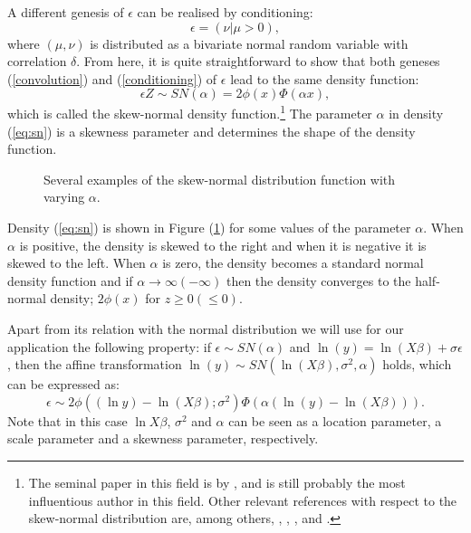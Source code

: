 \documentclass[11pt,parskip,abstracton,notitlepage]{scrartcl}
\begin{document}
A different genesis of $\epsilon $ can be realised by conditioning:
%
\begin{equation}
\epsilon  = (\nu|\mu>0),
\label{conditioning}
\end{equation}
%
where $(\mu, \nu)$ is distributed as a bivariate normal random variable with correlation $\delta$. From here, it is quite straightforward to show that both geneses (\ref{convolution}) and (\ref{conditioning}) of $\epsilon $ lead to the same density function:
%
\begin{equation}
\epsilon Z\sim SN(\alpha) = 2\phi(x)\Phi(\alpha x),
\label{eq:sn}
\end{equation}
%
which is called the skew-normal density function.\footnote{The seminal paper in this field is by \cite{AZZALINI1985}, and is still probably the most influentious author in this field. Other relevant references with respect to the skew-normal distribution are, among others, \citet{AZZALINI1996}, \citet{AZZALINI1999}, \citet{AZZALINI2005}, \citet{arellano2006unification} and \citet{arellano2008centred}.} The parameter $\alpha$ in density (\ref{eq:sn}) is a skewness parameter and determines the shape of the density function. 
%
\begin{figure}[h]
	\center
{}
\caption{Several examples of the skew-normal distribution function with varying $\alpha$.}
\label{fig:sn}
\end{figure}
%

Density (\ref{eq:sn}) is shown in Figure (\ref{fig:sn}) for some values of the parameter $\alpha$. When $\alpha$ is positive, the density is skewed to the right and when it is negative it is skewed to the left. When $\alpha$ is zero, the density becomes a standard normal density function and if $\alpha \rightarrow \infty (-\infty)$ then the density converges to the half-normal density; $2\phi(x)$ for $z \geq 0 (\leq 0)$.

Apart from its relation with the normal distribution we will use for our application the following property: if $\epsilon  \sim SN(\alpha)$ and $\ln (y) = \ln \left(X\beta\right) + \sigma \epsilon $, then the affine transformation $\ln (y) \sim SN (\ln \left(X\beta\right) , \sigma^2, \alpha)$ holds, which can be expressed as:
%
\begin{equation}
\epsilon \sim 2\phi(\left(\ln y\right)  -\ln \left(X\beta\right); \sigma^2)\Phi(\alpha(\ln \left(y\right)  - \ln \left(X\beta\right))). 
\label{SNunivariate}
\end{equation}
%
Note that in this case $\ln X\beta$, $\sigma^2$ and $\alpha$ can be seen as a location parameter, a scale parameter and a skewness parameter, respectively. 
\end{document}
